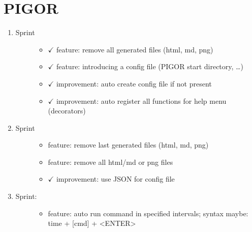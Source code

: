 \documentclass[letterpaper,10pt,english]{sphinxmanual}
\begin{document}
\section{PIGOR}
\label{\detokenize{sprints:pigor}}\begin{enumerate}
\def\theenumi{\arabic{enumi}}
\def\labelenumi{\theenumi .}
\makeatletter\def\p@enumii{\p@enumi \theenumi .}\makeatother
\item {} \begin{description}
\item[{Sprint}] \leavevmode\begin{itemize}
\item {} 
\(\checkmark\) feature: remove all generated files (html, md, png)

\item {} 
\(\checkmark\) feature: introducing a config file (PIGOR start directory, …)

\item {} 
\(\checkmark\) improvement: auto create config file if not present

\item {} 
\(\checkmark\) improvement: auto register all functions for help menu (decorators)

\end{itemize}

\end{description}

\item {} \begin{description}
\item[{Sprint}] \leavevmode\begin{itemize}
\item {} 
feature: remove last generated files (html, md, png)

\item {} 
feature: remove all html/md or png files

\item {} 
\(\checkmark\) improvement: use JSON for config file

\end{itemize}

\end{description}

\item {} \begin{description}
\item[{Sprint:}] \leavevmode\begin{itemize}
\item {} 
feature: auto run command in specified intervals; syntax maybe: time + {[}cmd{]} + \textless{}ENTER\textgreater{}

\end{itemize}

\end{description}

\end{enumerate}
\end{document}

